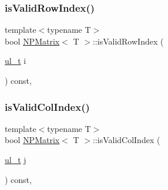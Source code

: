 \mbox{\label{class_n_p_matrix_afc5221cb1f5d1e1919801a0ff32751fe}} 
\subsubsection{\texorpdfstring{isValidRowIndex()}{isValidRowIndex()}}
{\footnotesize\ttfamily template$<$typename T$>$ \\
bool \mbox{\hyperlink{class_n_p_matrix}{N\+P\+Matrix}}$<$ T $>$\+::is\+Valid\+Row\+Index (\begin{DoxyParamCaption}\item[{\mbox{\hyperlink{typedef_8h_a1b140a2034db3f5dfe18a987745df43a}{ul\+\_\+t}}}]{i }\end{DoxyParamCaption}) const\hspace{0.3cm}{\ttfamily [inline]}, {\ttfamily [protected]}}

\mbox{\label{class_n_p_matrix_ab3f19d6c9259ef6e0a919ea7ad85a5a1}} 
\subsubsection{\texorpdfstring{isValidColIndex()}{isValidColIndex()}}
{\footnotesize\ttfamily template$<$typename T$>$ \\
bool \mbox{\hyperlink{class_n_p_matrix}{N\+P\+Matrix}}$<$ T $>$\+::is\+Valid\+Col\+Index (\begin{DoxyParamCaption}\item[{\mbox{\hyperlink{typedef_8h_a1b140a2034db3f5dfe18a987745df43a}{ul\+\_\+t}}}]{j }\end{DoxyParamCaption}) const\hspace{0.3cm}{\ttfamily [inline]}, {\ttfamily [protected]}}

\mbox{\label{class_n_p_matrix_a3d584ab75f97711997f39ffefef1f78b}} 
